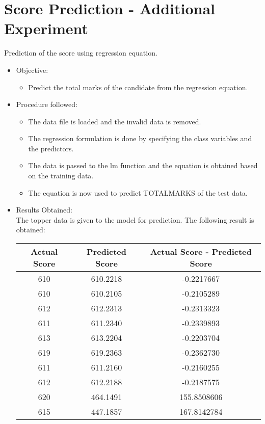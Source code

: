 \chapter{Score Prediction - Additional Experiment}
Prediction of the score using regression equation.
\begin{itemize}
	\item
	Objective:
	\begin{itemize}
		\item
		Predict the total marks of the candidate from the regression equation.
	\end{itemize}
	
	\item
	Procedure followed: 
	\begin{itemize}
		\item
		The data file is loaded and the invalid data is removed.
		\item
		The regression formulation is done by specifying the class variables and the predictors.
		\item
		The data is passed to the lm function and the equation is obtained based on the training data.
		\item
		The equation is now used to predict TOTAL\textunderscore MARKS of the test data.
	\end{itemize}
	
	\item
	Results Obtained:\\
	
		The topper data is given to the model for prediction. The following result is obtained:
		\begin{center}
		    \begin{tabular}{ | c | c | c |}
		    \hline
			   	 Actual Score & 	Predicted Score  & Actual Score - Predicted Score \\ 	\hline
				610	& 610.2218	& -0.2217667 \\ 	\hline
				610	& 610.2105	& -0.2105289 \\ 	\hline
				612	& 612.2313	& -0.2313323 \\ 	\hline
				611	& 611.2340	& -0.2339893 \\ 	\hline
				613	& 613.2204	& -0.2203704 \\ 	\hline
				619	& 619.2363	& -0.2362730 \\ 	\hline
				611	& 611.2160	& -0.2160255 \\ 	\hline
				612	& 612.2188	& -0.2187575 \\ 	\hline
				620	& 464.1491	& 155.8508606 \\ \hline
				615	& 447.1857	& 167.8142784 \\ \hline
	

\end{tabular}
\end{center}
\end{itemize}

